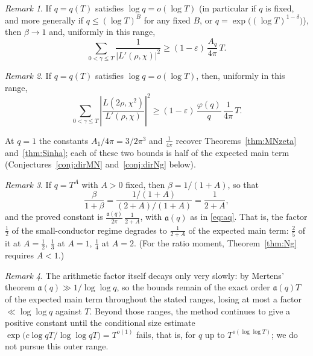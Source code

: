\documentclass[12pt,a4paper,reqno]{amsart}
\theoremstyle{remark}
\newtheorem*{remark}{Remark}
\numberwithin{equation}{section}
\begin{document}
\begin{remark}
If $q=q(T)$ satisfies $\log q=o(\log T)$ (in particular if $q$ is fixed, and more generally if $q\le(\log T)^B$ for any fixed $B$, or $q=\exp\bigl((\log T)^{1-\delta}\bigr)$), then $\beta\to1$ and, uniformly in this range,
\[
\sum_{0<\gamma\le T}\frac{1}{|L'(\rho,\chi)|^2}\ge(1-\varepsilon)\,\frac{A_q}{4\pi}\,T .
\]
\end{remark}

\begin{remark}
If $q=q(T)$ satisfies $\log q=o(\log T)$, then, uniformly in this range,
\[
\sum_{0<\gamma\le T}\left|\frac{L(2\rho,\chi^2)}{L'(\rho,\chi)}\right|^2\ge(1-\varepsilon)\,\frac{\varphi(q)}{q}\,\frac{1}{4\pi}\,T .
\]
\end{remark}

At $q=1$ the constants $A_1/4\pi=3/2\pi^3$ and $\tfrac{1}{4\pi}$ recover Theorems~\ref{thm:MNzeta} and~\ref{thm:Sinha}; each of these two bounds is half of the expected main term (Conjectures~\ref{conj:dirMN} and~\ref{conj:dirNg} below).

\begin{remark}
If $q=T^{A}$ with $A>0$ fixed, then $\beta=1/(1+A)$, so that
\[
\frac{\beta}{1+\beta}=\frac{1/(1+A)}{(2+A)/(1+A)}=\frac{1}{2+A},
\]
and the proved constant is $\frac{\mathfrak a(q)}{2\pi}\,\frac{1}{2+A}$, with $\mathfrak a(q)$ as in \eqref{eq:aq}. That is, the factor $\tfrac12$ of the small-conductor regime degrades to $\tfrac{1}{2+A}$ of the expected main term: $\tfrac25$ of it at $A=\tfrac12$, $\tfrac13$ at $A=1$, $\tfrac14$ at $A=2$. (For the ratio moment, Theorem~\ref{thm:Ng} requires $A<1$.)
\end{remark}

\begin{remark}
The arithmetic factor itself decays only very slowly: by Mertens' theorem $\mathfrak a(q)\gg1/\log\log q$, so the bounds remain of the exact order $\mathfrak a(q)T$ of the expected main term throughout the stated ranges, losing at most a factor $\ll\log\log q$ against $T$. Beyond those ranges, the method continues to give a positive constant until the conditional size estimate $\exp\bigl(c\log qT/\log\log qT\bigr)=T^{o(1)}$ fails, that is, for $q$ up to $T^{o(\log\log T)}$; we do not pursue this outer range.
\end{remark}
\end{document}
